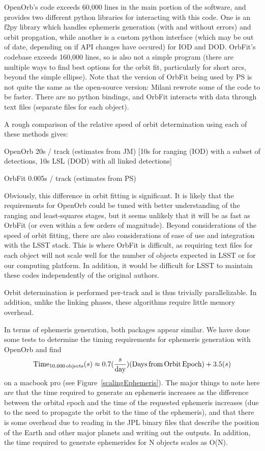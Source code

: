 OpenOrb's code exceeds 60,000 lines in the main portion of the software, and provides two different python libraries for interacting with this code. One is an f2py library which handles ephemeris generation (with and without errors) and orbit propgation, while another is a custom python interface (which may be out of date, depending on if API changes have occured) for IOD and DOD.  OrbFit's codebase exceeds 160,000 lines, so is also not a simple program (there are multiple ways to find best options for the orbit fit, particularly for short arcs, beyond the simple ellipse). Note that the version of OrbFit being used by PS is not quite the same as the open-source version: Milani rewrote some of the code to be faster. There are no python bindings, and OrbFit interacts with data through text files (separate files for each object). 

A rough comparison of the relative speed of orbit determination using each of these methods gives:
\begin{itemize}
{\item OpenOrb 20s / track (estimates from JM) [10s for ranging (IOD) with a subset of detections, 10s LSL (DOD) with all linked detections] }
{\item OrbFit 0.005s / track (estimates from PS)}
\end{itemize}
Obviously, this difference in orbit fitting is significant. It is likely that the requirements for OpenOrb could be tuned with better understanding of the ranging and least-squares stages, but it seems unlikely that it will be as fast as OrbFit (or even within a few orders of magnitude).  Beyond considerations of the speed of orbit fitting, there are also considerations of ease of use and integration with the LSST stack. This is where OrbFit is difficult, as requiring text files for each object will not scale well for the number of objects expected in LSST or for our computing platform. In addition, it would be difficult for LSST to maintain these codes independently of the original authors. 

Orbit determination is performed per-track and is thus trivially parallelizable. In addition, unlike the linking phases, these algorithms require little memory overhead. 

In terms of ephemeris generation, both packages appear similar. We have done some tests to determine the timing requirements for ephemeris generation with OpenOrb and find 
\begin{equation}
\text{Time}_{10,000\text{\,objects}} (s) \approx 0.7(\frac{s}{\text{day}}) (\text{Days\,from\,Orbit\,Epoch}) + 3.5 (s)
\end{equation}
on a macbook pro (see Figure~\ref{scalingEphemeris}). The major things to note here are that the time required to generate an ephemeris increases as the difference between the orbital epoch and the time of the requested ephemeris increases (due to the need to propagate the orbit to the time of the ephemeris), and that there is some overhead due to reading in the JPL binary files that describe the position of the Earth and other major planets and writing out the outputs. In addition, the time required to generate ephemerides for N objects scales as O(N). 



